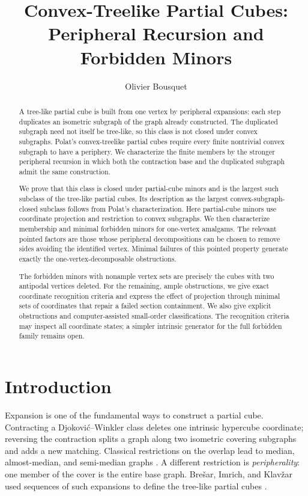 \documentclass[11pt]{article}
\title{Convex-Treelike Partial Cubes:\\
Peripheral Recursion and Forbidden Minors}
\author{Olivier Bousquet}
\date{}
\theoremstyle{definition}
\theoremstyle{remark}
\begin{document}
\maketitle

\begin{abstract}
A tree-like partial cube is built from one vertex by peripheral expansions:
each step duplicates an isometric subgraph of the graph already constructed.
The duplicated subgraph need not itself be tree-like, so this class is not
closed under convex subgraphs. Polat's convex-treelike partial cubes require
every finite nontrivial convex subgraph to have a periphery. We characterize
the finite members by the stronger peripheral recursion in which both the
contraction base and the duplicated subgraph admit the same construction.

We prove that this class is closed under partial-cube minors and is the
largest such subclass of the tree-like partial cubes. Its description as
the largest convex-subgraph-closed subclass follows from Polat's
characterization. Here partial-cube minors use coordinate
projection and restriction to convex subgraphs. We then characterize
membership and minimal forbidden minors for one-vertex amalgams. The relevant
pointed factors are those whose peripheral decompositions can be chosen to
remove sides avoiding the identified vertex. Minimal failures of this
pointed property generate exactly the one-vertex-decomposable obstructions.

The forbidden minors with nonample vertex sets are precisely the cubes with
two antipodal vertices deleted. For the remaining, ample obstructions, we
give exact coordinate recognition criteria and express the effect of
projection through minimal sets of coordinates that repair a failed section
containment. We also give explicit obstructions and computer-assisted
small-order classifications. The recognition criteria may inspect all
coordinate states; a simpler intrinsic generator for the full forbidden
family remains open.
\end{abstract}

\section{Introduction}

Expansion is one of the fundamental ways to construct a partial cube.
Contracting a Djokovi\'c--Winkler class deletes one intrinsic hypercube
coordinate; reversing the contraction splits a graph along two isometric
covering subgraphs and adds a new matching.  Classical restrictions on the
overlap lead to median, almost-median, and semi-median graphs
\cite{ImrichKlavzar98,BresarImrichKlavzar03fast}.  A different restriction
is \emph{peripherality}: one member of the cover is the entire base graph.
Bre\v{s}ar, Imrich, and Klav\v{z}ar used sequences of such expansions to
define the tree-like partial cubes \cite{BresarImrichKlavzar03}.
\end{document}
